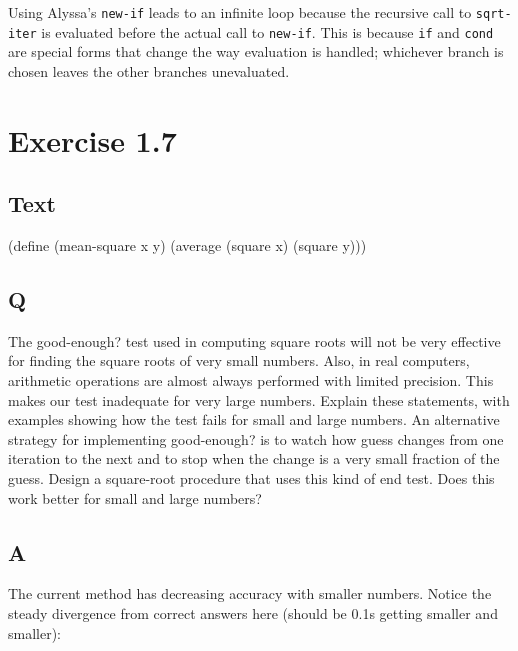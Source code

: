 \documentclass[
]{article}
\newenvironment{Shaded}{}{}
\newcommand{\ExtensionTok}[1]{#1}
\newcommand{\FunctionTok}[1]{\textcolor[rgb]{0.02,0.16,0.49}{#1}}
\newcommand{\NormalTok}[1]{#1}
\begin{document}
Using Alyssa's \texttt{new-if} leads to an infinite loop because the
recursive call to \texttt{sqrt-iter} is evaluated before the actual call
to \texttt{new-if}. This is because \texttt{if} and \texttt{cond} are
special forms that change the way evaluation is handled; whichever
branch is chosen leaves the other branches unevaluated.

\hypertarget{exercise-1.7}{%
\section{Exercise 1.7}\label{exercise-1.7}}

\hypertarget{text-1}{%
\subsection{Text}\label{text-1}}

\hypertarget{mean-square}{%
\label{mean-square}}%
\begin{Shaded}
\begin{Highlighting}[]
\NormalTok{(}\ExtensionTok{define}\FunctionTok{ }\NormalTok{(mean{-}square x y)}
\NormalTok{  (average (square x) (square y)))}
\end{Highlighting}
\end{Shaded}

\hypertarget{q-6}{%
\subsection{Q}\label{q-6}}

The good-enough? test used in computing square roots will not be very
effective for finding the square roots of very small numbers. Also, in
real computers, arithmetic operations are almost always performed with
limited precision. This makes our test inadequate for very large
numbers. Explain these statements, with examples showing how the test
fails for small and large numbers. An alternative strategy for
implementing good-enough? is to watch how guess changes from one
iteration to the next and to stop when the change is a very small
fraction of the guess. Design a square-root procedure that uses this
kind of end test. Does this work better for small and large numbers?

\hypertarget{a-6}{%
\subsection{A}\label{a-6}}

The current method has decreasing accuracy with smaller numbers. Notice
the steady divergence from correct answers here (should be 0.1s getting
smaller and smaller):
\end{document}

